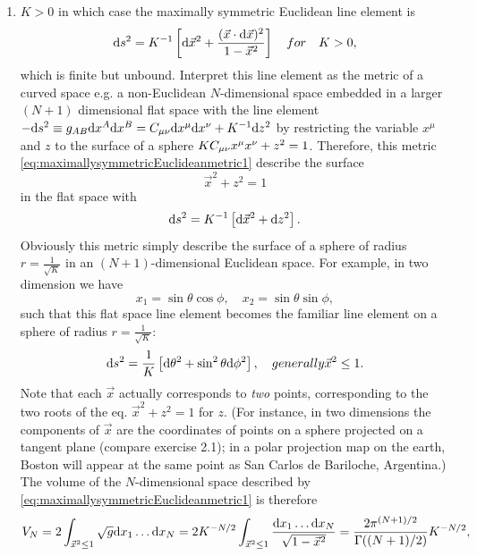 \begin{enumerate} 
	\item $K>0$ in which case the maximally symmetric Euclidean line element is
\begin{equation}
\label{eq:maximallysymmetricEuclideanmetric1}
	\mathrm{d} s^2 = K^{-1} \left[\mathrm{d} \vec{x}^2 + \frac{(\vec{x}\cdot \mathrm{d} \vec{x})^2}{1-\vec{x}^2}\right] \quad for \quad K>0,
\end{equation}
which is finite but unbound. Interpret this line element as the metric of a curved space e.g. a non-Euclidean $N$-dimensional space embedded in a larger $(N+1)$ dimensional flat space with the line element $-\mathrm{d} s^2 \equiv g_{AB} \mathrm{d} x^A \mathrm{d} x^B=C_{\mu \nu} \mathrm{d} x^\mu \mathrm{d} x^\nu + K^{-1} \mathrm{d} z^2$ by restricting the variable $x^\mu$ and $z$ to the surface of a sphere $K C_{\mu \nu} x^\mu x^\nu +z^2 =1$. Therefore, this metric \ref{eq:maximallysymmetricEuclideanmetric1} describe the surface
\begin{equation}
\vec{x}^2 +z^2 =1
\end{equation}
in the flat space with
\begin{equation}
	\mathrm{d} s^2 = K^{-1} \left[\mathrm{d} \vec{x}^2 + \mathrm{d} z^2\right].
\end{equation}
Obviously this metric simply describe the surface of a sphere of radius $r=\frac{1}{\sqrt{K}}$ in an $(N+1)$-dimensional Euclidean space. For example, in two dimension we have
\begin{equation}
	x_1 = \sin \theta \cos \phi, \quad x_2 = \sin \theta \sin\phi,
\end{equation}
such that this flat space line element becomes the familiar line element on a sphere of radius $r=\frac{1}{\sqrt{K}}$:
\begin{equation}
	\mathrm{d} s^2 = \frac{1}{K} \left[\mathrm{d} \theta^2 +  \sin^2 \theta \mathrm{d} \phi^2 \right], \quad generally \vec{x}^2\leq 1.
\end{equation}
Note that each $\vec{x}$ actually corresponds to \emph{two} points, corresponding to the two roots of the eq. $\vec{x}^2+z^2=1$ for $z$. (For instance, in two dimensions the components of $\vec{x}$ are the coordinates of points on a sphere projected on a tangent plane (compare exercise 2.1); in a polar projection map on the earth, Boston will appear at the same point as San Carlos de Bariloche, Argentina.) The volume of the $N$-dimensional space described by \ref{eq:maximallysymmetricEuclideanmetric1} is therefore
\begin{equation}
V_N=2 \int_{\vec{x}^2\leq 1} \sqrt{g} \md x_1 \dots \md x_N = 2 K^{-N/2} \int_{\vec{x}^2\leq 1} \frac{\md x_1 \dots \md x_N}{\sqrt{1-\vec{x}^2}} = \frac{2 \pi^{(N+1)/2}}{\Gamma((N+1)/2)} K^{-N/2},

\end{equation}
\end{enumerate}
